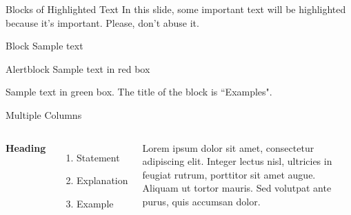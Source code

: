 \documentclass[aspectratio=169,xcolor=dvipsnames]{beamer}
\begin{document}
	
	\begin{frame}{Blocks of Highlighted Text}
		In this slide, some important text will be \alert{highlighted} because it's important. Please, don't abuse it.
		
		\begin{block}{Block}
			Sample text
		\end{block}
		
		\begin{alertblock}{Alertblock}
			Sample text in red box
		\end{alertblock}
		
		\begin{examples}
			Sample text in green box. The title of the block is ``Examples".
		\end{examples}
	\end{frame}
	
	
	\begin{frame}{Multiple Columns}
		\begin{columns}[c] %
			
			\textbf{Heading}
			\begin{enumerate}
				\item Statement
				\item Explanation
				\item Example
			\end{enumerate}
			
			Lorem ipsum dolor sit amet, consectetur adipiscing elit. Integer lectus nisl, ultricies in feugiat rutrum, porttitor sit amet augue. Aliquam ut tortor mauris. Sed volutpat ante purus, quis accumsan dolor.
			
		\end{columns}
	\end{frame}
	
\end{document}
